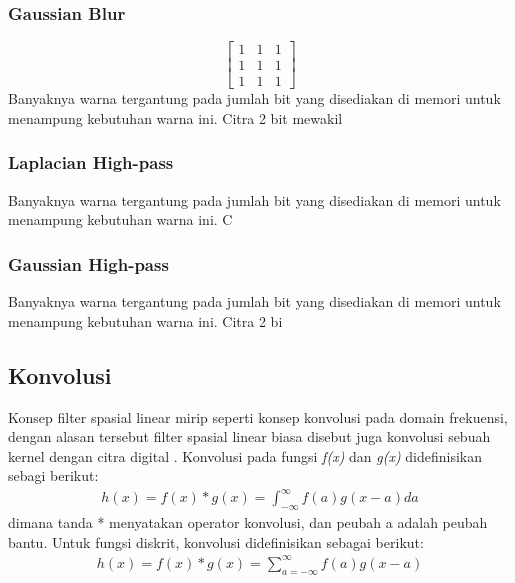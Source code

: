 \subsubsection{Gaussian Blur}
\begin{equation*}
    \label{kernel:mean2}
    \left[
    \begin{matrix}
        1 & 1 & 1 \\
        1 & 1 & 1 \\
        1 & 1 & 1
    \end{matrix}
    \right]
\end{equation*}
Banyaknya warna tergantung pada jumlah bit yang disediakan di memori untuk menampung kebutuhan warna ini. Citra 2 bit mewakil

\subsubsection{Laplacian High-pass}
Banyaknya warna tergantung pada jumlah bit yang disediakan di memori untuk menampung kebutuhan warna ini. C

\subsubsection{Gaussian High-pass}
Banyaknya warna tergantung pada jumlah bit yang disediakan di memori untuk menampung kebutuhan warna ini. Citra 2 bi


\subsection{Konvolusi}
Konsep filter spasial linear mirip seperti konsep konvolusi pada domain frekuensi, dengan alasan tersebut filter spasial linear biasa disebut juga konvolusi sebuah kernel dengan citra digital . Konvolusi pada fungsi \textit{f(x)} dan \textit{g(x)} didefinisikan sebagi berikut:
\begin{equation}
    \label{eq:conv1}
    \begin{split}
        h(x) = f(x) * g(x) = \int_{-\infty}^{\infty} f(a) g(x-a) da
    \end{split}
\end{equation}
dimana tanda * menyatakan operator konvolusi, dan peubah a adalah peubah bantu. Untuk fungsi diskrit, konvolusi didefinisikan sebagai berikut:
\begin{equation}
    \label{eq:conv2}
    \begin{split}
         h(x) = f(x) * g(x) = \sum_{a=-\infty}^{\infty} f(a)g(x-a)
    \end{split}
\end{equation}

